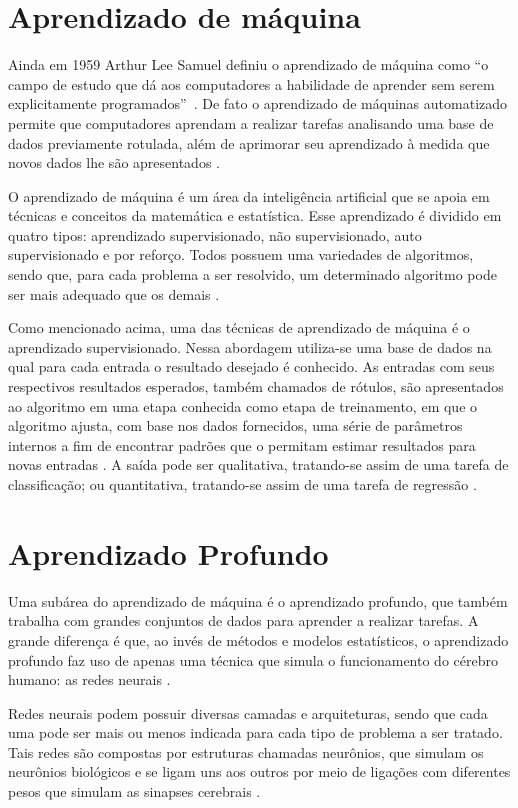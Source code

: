 \section{Aprendizado de máquina} \label{subsec:AutoML}
Ainda em 1959 Arthur Lee Samuel definiu o aprendizado de máquina como ``o campo de estudo que dá aos computadores a habilidade de aprender sem serem explicitamente programados''~\cite{simon2013too}. De fato o aprendizado de máquinas automatizado permite que computadores aprendam a realizar tarefas analisando uma base de dados previamente rotulada, além de aprimorar seu aprendizado à medida que novos dados lhe são apresentados \cite{monard2003conceitos}.

O aprendizado de máquina é um área da inteligência artificial que se apoia em técnicas e conceitos da matemática e estatística. Esse aprendizado é dividido em quatro tipos: aprendizado supervisionado, não supervisionado, auto supervisionado e por reforço. Todos possuem uma variedades de algoritmos, sendo que, para cada problema a ser resolvido, um determinado algoritmo pode ser mais adequado que os demais \cite{mueller2019deep}.

Como mencionado acima, uma das técnicas de aprendizado de máquina é o aprendizado supervisionado. Nessa abordagem utiliza-se uma base de dados na qual para cada entrada o resultado desejado é conhecido. As entradas com seus respectivos resultados esperados, também chamados de rótulos, são apresentados ao algoritmo em uma etapa conhecida como etapa de treinamento, em que o algoritmo ajusta, com base nos dados fornecidos, uma série de parâmetros internos a fim de encontrar padrões que o permitam estimar resultados para novas entradas \cite{monard2003conceitos}. A saída pode ser qualitativa, tratando-se assim de uma tarefa de classificação; ou quantitativa, tratando-se assim de uma tarefa de regressão \cite{mueller2019deep}.

\section{Aprendizado Profundo}

Uma subárea do aprendizado de máquina é o aprendizado profundo, que também trabalha com grandes conjuntos de dados para aprender a realizar tarefas. A grande diferença é que, ao invés de métodos e modelos estatísticos, o aprendizado profundo faz uso de apenas uma técnica que simula o funcionamento do cérebro humano: as redes neurais \cite{mueller2019deep}. 

Redes neurais podem possuir diversas camadas e arquiteturas, sendo que cada uma pode ser mais ou menos indicada para cada tipo de problema a ser tratado.
Tais redes são compostas por estruturas chamadas neurônios, que simulam os neurônios biológicos e se ligam uns aos outros por meio de ligações com diferentes pesos que simulam as sinapses cerebrais \cite{mueller2019deep}.

